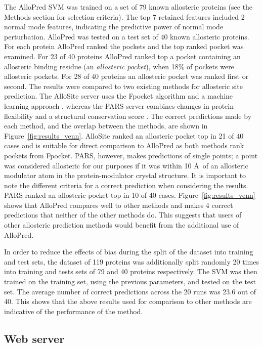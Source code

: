 The AlloPred SVM was trained on a set of 79 known allosteric proteins (see the Methods section for selection criteria).
The top 7 retained features included 2 normal mode features, indicating the predictive power of normal mode perturbation.
AlloPred was tested on a test set of 40 known allosteric proteins.
For each protein AlloPred ranked the pockets and the top ranked pocket was examined.
For 23 of 40 proteins AlloPred ranked top a pocket containing an allosteric binding residue (an \emph{allosteric pocket}), when 18\% of pockets were allosteric pockets.
For 28 of 40 proteins an allosteric pocket was ranked first or second.
The results were compared to two existing methods for allosteric site prediction.
The AlloSite server uses the Fpocket algorithm and a machine learning approach \cite{Huang2013}, whereas the PARS server combines changes in protein flexibility and a structural conservation score \cite{Panjkovich2014}.
The correct predictions made by each method, and the overlap between the methods, are shown in Figure~\ref{fig:results_venn}.
AlloSite ranked an allosteric pocket top in 21 of 40 cases and is suitable for direct comparison to AlloPred as both methods rank pockets from Fpocket.
PARS, however, makes predictions of single points; a point was considered allosteric for our purposes if it was within 10 \AA\ of an allosteric modulator atom in the protein-modulator crystal structure.
It is important to note the different criteria for a correct prediction when considering the results.
PARS ranked an allosteric pocket top in 10 of 40 cases.
Figure~\ref{fig:results_venn} shows that AlloPred compares well to other methods and makes 4 correct predictions that neither of the other methods do.
This suggests that users of other allosteric prediction methods would benefit from the additional use of AlloPred.

In order to reduce the effects of bias during the split of the dataset into training and test sets, the dataset of 119 proteins was additionally split randomly 20 times into training and tests sets of 79 and 40 proteins respectively.
The SVM was then trained on the training set, using the previous parameters, and tested on the test set.
The average number of correct predictions across the 20 runs was 23.6 out of 40.
This shows that the above results used for comparison to other methods are indicative of the performance of the method.


\subsection{Web server}


